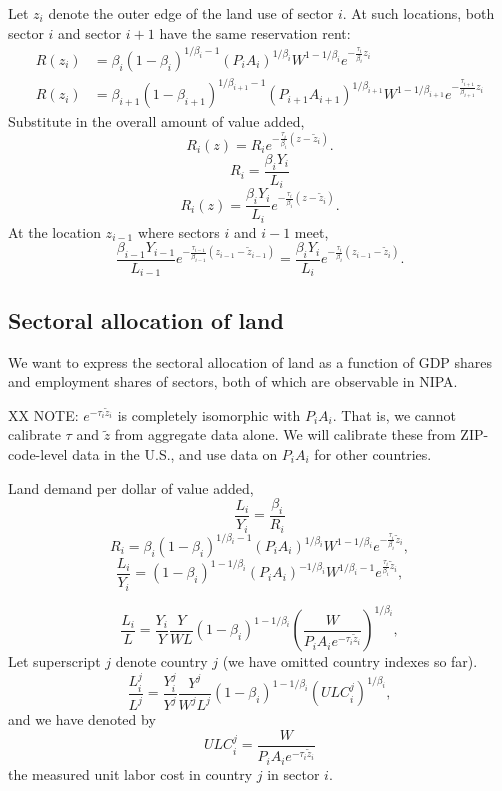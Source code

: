 \documentclass[12pt]{article}
\begin{document}
Let $z_i$ denote the outer edge of the land use of sector $i$. At such locations, both sector $i$ and sector $i+1$ have the same reservation rent:
\begin{align*}
R(z_i) &=\beta_i(1-\beta_i)^{1/\beta_i-1} (P_iA_i)^{1/\beta_i} W^{1-1/\beta_i} e^{-\frac{\tau_i}{\beta_i} z_i}\\
R(z_i) &=\beta_{i+1}(1-\beta_{i+1})^{1/\beta_{i+1}-1} (P_{i+1}A_{i+1})^{1/\beta_{i+1}} W^{1-1/\beta_{i+1}} e^{-\frac{\tau_{i+1}}{\beta_{i+1}} z_i}
\end{align*}
Substitute in the overall amount of value added,
\[
R_i(z) = R_i e^{-\frac{\tau_i}{\beta_i}(z-\tilde z_i)}.
\]
\[
R_i = \frac{\beta_i Y_i}{L_i}
\]
\[
R_i(z) = \frac{\beta_i Y_i}{L_i} e^{-\frac{\tau_i}{\beta_i}(z-\tilde z_i)}.
\]
At the location $z_{i-1}$ where sectors $i$ and $i-1$ meet,
\[
\frac{\beta_{i-1} Y_{i-1}}{L_{i-1}}
  e^{-\frac{\tau_{i-1}}{\beta_{i-1}}(z_{i-1}-\tilde z_{i-1})} =
\frac{\beta_i Y_i}{L_i}
  e^{-\frac{\tau_i}{\beta_i}(z_{i-1} -\tilde z_i)}.
\]

\subsection{Sectoral allocation of land}
We want to express the sectoral allocation of land as a function of GDP shares and employment shares of sectors, both of which are observable in NIPA.

XX NOTE: $e^{-\tau_i \tilde z_i}$ is completely isomorphic with $P_iA_i$. That is, we cannot calibrate $\tau$ and $\tilde z$ from aggregate data alone. We will calibrate these from ZIP-code-level data in the U.S., and use data on $P_iA_i$ for other countries.

Land demand per dollar of value added,
\[
\frac{L_i}{Y_i} =
\frac{\beta_i}{R_i}
\]
\[
R_i =\beta_i(1-\beta_i)^{1/\beta_i-1} (P_iA_i)^{1/\beta_i}W^{1-1/\beta_i} e^{-\frac{\tau_i}{\beta_i} \tilde z_i},
\]
\[
\frac{L_i}{Y_i} =
(1-\beta_i)^{1-1/\beta_i} (P_iA_i)^{-1/\beta_i}W^{1/\beta_i-1} e^{\frac{\tau_i}{\beta_i} \tilde z_i},
\]

\[
\frac{L_i}{L} = \frac{Y_i}{Y}\frac{Y}{WL}
(1-\beta_i)^{1-1/\beta_i}\left(\frac{W}{P_iA_i e^{-\tau_i\tilde z_i}}\right)^{1/\beta_i} ,
\]
Let superscript $j$ denote country $j$ (we have omitted country indexes so far).
\begin{equation}
\label{eq:LandShare}
\frac{L_i^j}{L^j} = \frac{Y_i^j}{Y^j}\frac{Y^j}{W^jL^j}
(1-\beta_i)^{1-1/\beta_i}\left(ULC_i^j\right)^{1/\beta_i} ,
\end{equation}
and we have denoted by
\[
ULC_i^j
=
\frac{W}{P_iA_i e^{-\tau_i\tilde z_i}}
\]
the measured unit labor cost in country $j$ in sector $i$.
\end{document}
